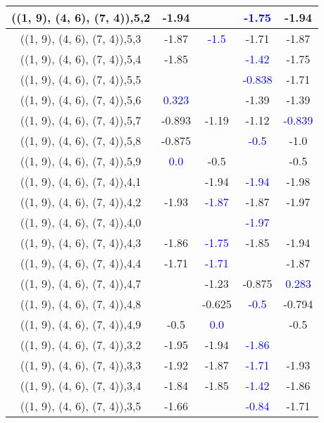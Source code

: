\documentclass{article}
\begin{document}
\begin{center}
\begin{longtable}{|c|c|c|c|c|}
        	\hline
        	((1, 9), (4, 6), (7, 4)),5,2&-1.94&& \textcolor{blue}{-1.75}&-1.94\\
        	\hline
        	((1, 9), (4, 6), (7, 4)),5,3&-1.87& \textcolor{blue}{-1.5}&-1.71&-1.87\\
        	\hline
        	((1, 9), (4, 6), (7, 4)),5,4&-1.85&& \textcolor{blue}{-1.42}&-1.75\\
        	\hline
        	((1, 9), (4, 6), (7, 4)),5,5&&& \textcolor{blue}{-0.838}&-1.71\\
        	\hline
        	((1, 9), (4, 6), (7, 4)),5,6& \textcolor{blue}{0.323}&&-1.39&-1.39\\
        	\hline
        	((1, 9), (4, 6), (7, 4)),5,7&-0.893&-1.19&-1.12& \textcolor{blue}{-0.839}\\
        	\hline
        	((1, 9), (4, 6), (7, 4)),5,8&-0.875&& \textcolor{blue}{-0.5}&-1.0\\
        	\hline
        	((1, 9), (4, 6), (7, 4)),5,9& \textcolor{blue}{0.0}&-0.5&&-0.5\\
        	\hline
        	((1, 9), (4, 6), (7, 4)),4,1&&-1.94& \textcolor{blue}{-1.94}&-1.98\\
        	\hline
        	((1, 9), (4, 6), (7, 4)),4,2&-1.93& \textcolor{blue}{-1.87}&-1.87&-1.97\\
        	\hline
        	((1, 9), (4, 6), (7, 4)),4,0&&& \textcolor{blue}{-1.97}&\\
        	\hline
        	((1, 9), (4, 6), (7, 4)),4,3&-1.86& \textcolor{blue}{-1.75}&-1.85&-1.94\\
        	\hline
        	((1, 9), (4, 6), (7, 4)),4,4&-1.71& \textcolor{blue}{-1.71}&&-1.87\\
        	\hline
        	((1, 9), (4, 6), (7, 4)),4,7&&-1.23&-0.875& \textcolor{blue}{0.283}\\
        	\hline
        	((1, 9), (4, 6), (7, 4)),4,8&&-0.625& \textcolor{blue}{-0.5}&-0.794\\
        	\hline
        	((1, 9), (4, 6), (7, 4)),4,9&-0.5& \textcolor{blue}{0.0}&&-0.5\\
        	\hline
        	((1, 9), (4, 6), (7, 4)),3,2&-1.95&-1.94& \textcolor{blue}{-1.86}&\\
        	\hline
        	((1, 9), (4, 6), (7, 4)),3,3&-1.92&-1.87& \textcolor{blue}{-1.71}&-1.93\\
        	\hline
        	((1, 9), (4, 6), (7, 4)),3,4&-1.84&-1.85& \textcolor{blue}{-1.42}&-1.86\\
        	\hline
        	((1, 9), (4, 6), (7, 4)),3,5&-1.66&& \textcolor{blue}{-0.84}&-1.71\\

\end{longtable}
\end{center}
\end{document}
